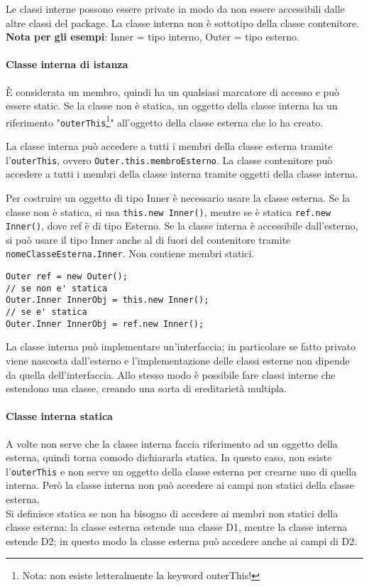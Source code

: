 Le classi interne possono essere private in modo da non essere accessibili dalle altre classi del package.
La classe interna non è sottotipo della classe contenitore. \\
\textbf{Nota per gli esempi}: Inner = tipo interno, Outer = tipo esterno.

\paragraph{Classe interna di istanza}
È considerata un membro, quindi ha un qualsiasi marcatore di accesso e può essere static. Se la classe non è statica, un oggetto della classe interna ha un riferimento "\texttt{outerThis}\footnote{Nota: non esiste letteralmente la keyword outerThis!}" all'oggetto della classe esterna che lo ha creato.

La classe interna può accedere a tutti i membri della classe esterna tramite l'\texttt{outerThis}, ovvero \texttt{Outer.this.membroEsterno}.
La classe contenitore può accedere a tutti i membri della classe interna tramite oggetti della classe interna.

Per costruire un oggetto di tipo Inner è necessario usare la classe esterna. Se la classe non è statica, si usa \texttt{this.new Inner()}, mentre se è statica \texttt{ref.new Inner()}, dove ref è di tipo Esterno.
Se la classe interna è accessibile dall'esterno, si può usare il tipo Inner anche al di fuori del contenitore tramite \texttt{nomeClasseEsterna.Inner}. 
Non contiene membri statici.
\vspace{2\parskip}
\begin{lstlisting}
Outer ref = new Outer();
// se non e' statica
Outer.Inner InnerObj = this.new Inner();
// se e' statica
Outer.Inner InnerObj = ref.new Inner();
\end{lstlisting}
La classe interna può implementare un'interfaccia; in particolare se fatto privato viene nascosta dall'esterno e l'implementazione delle classi esterne non dipende da quella dell'interfaccia. Allo stesso modo è possibile fare classi interne che estendono una classe, creando una sorta di ereditarietà multipla.

\paragraph{Classe interna statica} %
A volte non serve che la classe interna faccia riferimento ad un oggetto della esterna, quindi torna comodo dichiararla statica. In questo caso, non esiste l'\texttt{outerThis} e non serve un oggetto della classe esterna per crearne uno di quella interna. Però la classe interna non può accedere ai campi non statici della classe esterna.\\
Si definisce statica se non ha bisogno di accedere ai membri non statici della classe esterna: la classe esterna estende una classe D1, mentre la classe interna estende D2; in questo modo la classe esterna può accedere anche ai campi di D2.

